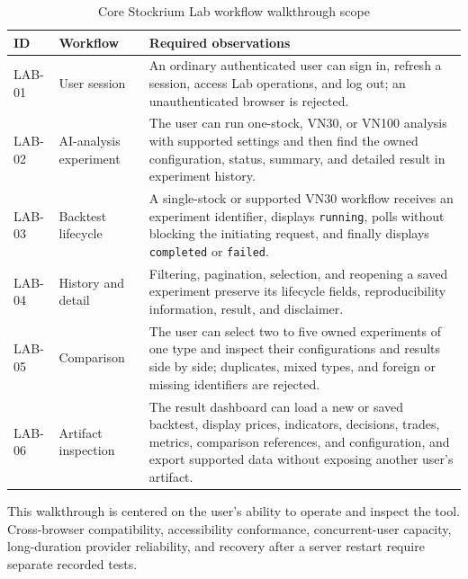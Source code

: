 \begin{table}[H]
    \centering
    \caption{Core Stockrium Lab workflow walkthrough scope}
    \label{tab:lab-walkthrough-scope}
    \footnotesize
    \begin{tabularx}{\textwidth}{>{\raggedright\arraybackslash}p{1.35cm} >{\raggedright\arraybackslash}p{3.1cm} X}
        \toprule
        \textbf{ID} & \textbf{Workflow} & \textbf{Required observations} \\
        \midrule
        LAB-01 & User session & An ordinary authenticated user can sign in, refresh a session, access Lab operations, and log out; an unauthenticated browser is rejected. \\
        \addlinespace
        LAB-02 & AI-analysis experiment & The user can run one-stock, VN30, or VN100 analysis with supported settings and then find the owned configuration, status, summary, and detailed result in experiment history. \\
        \addlinespace
        LAB-03 & Backtest lifecycle & A single-stock or supported VN30 workflow receives an experiment identifier, displays \texttt{running}, polls without blocking the initiating request, and finally displays \texttt{completed} or \texttt{failed}. \\
        \addlinespace
        LAB-04 & History and detail & Filtering, pagination, selection, and reopening a saved experiment preserve its lifecycle fields, reproducibility information, result, and disclaimer. \\
        \addlinespace
        LAB-05 & Comparison & The user can select two to five owned experiments of one type and inspect their configurations and results side by side; duplicates, mixed types, and foreign or missing identifiers are rejected. \\
        \addlinespace
        LAB-06 & Artifact inspection & The result dashboard can load a new or saved backtest, display prices, indicators, decisions, trades, metrics, comparison references, and configuration, and export supported data without exposing another user's artifact. \\
        \bottomrule
    \end{tabularx}
\end{table}

This walkthrough is centered on the user's ability to operate and inspect the tool. Cross-browser compatibility, accessibility conformance, concurrent-user capacity, long-duration provider reliability, and recovery after a server restart require separate recorded tests.

